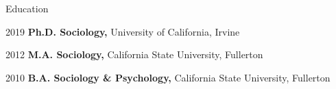 \begin{rSection}{Education}

\begin{hangt}{2019 \datefill}
{\bf Ph.D. Sociology,} University of California, Irvine \vspace*{-.75em} 
\end{hangt}
\begin{hangt}{2012 \datefill}
{\bf M.A. Sociology,} California State University, Fullerton \vspace*{-.75em} 
\end{hangt}
\begin{hangt}{2010 \datefill}
{\bf B.A. Sociology \& Psychology,} California State University, Fullerton 
\end{hangt}


\end{rSection}





